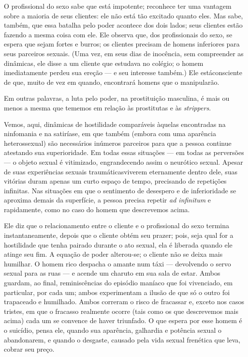 O profissional do sexo sabe que está impotente; reconhece ter uma
vantagem sobre a maioria de seus clientes: ele não está tão excitado
quanto eles. Mas sabe, também, que essa batalha pelo poder acontece dos
dois lados; seus clientes estão fazendo a mesma coisa com ele. Ele
observa que, dos profissionais do sexo, se espera que sejam fortes e
burros; os clientes precisam de homens inferiores para seus parceiros
sexuais. (Uma vez, em seus dias de inocência, sem compreender as
dinâmicas, ele disse a um cliente que estudava no colégio; o homem
imediatamente perdeu sua ereção --- e seu interesse também.) Ele está\idxprostpas[|)]
consciente de que, muito de vez em quando, encontrará homens que o manipularão.

Em outras palavras, a luta pelo poder, na prostituição masculina, é
mais ou menos a mesma que tememos em relação às prostitutas e às
\emph{strippers}.

Vemos, aqui, dinâmicas de hostilidade comparáveis àquelas
encontradas na ninfomania\idxninfo{} e na satiríase,\idxsatiri{} em que também (embora com uma
aparência heterossexual) são necessários inúmeros parceiros para que a
pessoa continue atestando sua superioridade. Em todas essas situações
--- em todas as perversões --- o objeto sexual é vitimizado,\idxhostviti{}
engrandecendo assim o neurótico sexual. Apesar de suas experiências
sexuais traumáticas\idxtraumapros[|(] viverem eternamente dentro dele, suas vitórias
duram apenas um curto espaço de tempo, precisando de repetições
infinitas. Nas situações em que o sentimento de desespero e de
inferioridade se aproxima demais da superfície, a pessoa precisa
repetir \textit{ad infinitum} e rapidamente, como no caso do homem que
descrevemos acima.

Ele diz que o relacionamento entre o cliente e o profissional do
sexo termina instantaneamente, depois que o cliente obtém seu prazer;
pois, seja qual for a hostilidade que tenha pairado durante o ato
sexual, ela é liberada quando ele atinge seu fim. A equação de poder
alterou-se; o cliente não se deixa mais humilhar. O homem rico despacha
o amante num táxi --- devolvendo o servo sexual para as ruas --- e
acende um charuto em sua sala de estar. Ambos guardam, ao final,
reminiscências do episódio maníaco que foi vivenciado, em particular,
por cada um; ambos experimentam a ilusão de que só o outro foi
trapaceado e humilhado. Ambos correram o risco de fracassar e, exceto
nos casos tristes, em que o fracasso realmente ocorre (tais como os que
descrevemos mais acima) cada um se convence de haver triunfado. O que
espera por esse homem é o suicídio, pensa ele, quando sua aparência,
galhardia e potência sexual o abandonarem, e quando o desgaste, causado
pela vida sexual frenética que leva, cobrar seu preço.

